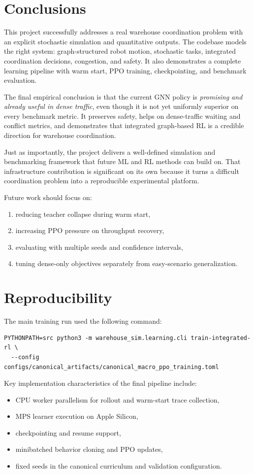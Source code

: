 \documentclass[11pt]{article}
\begin{document}
\section{Conclusions}
This project successfully addresses a real warehouse coordination problem with an explicit stochastic simulation and quantitative outputs. The codebase models the right system: graph-structured robot motion, stochastic tasks, integrated coordination decisions, congestion, and safety. It also demonstrates a complete learning pipeline with warm start, PPO training, checkpointing, and benchmark evaluation.

The final empirical conclusion is that the current GNN policy is \emph{promising and already useful in dense traffic}, even though it is not yet uniformly superior on every benchmark metric. It preserves safety, helps on dense-traffic waiting and conflict metrics, and demonstrates that integrated graph-based RL is a credible direction for warehouse coordination.

Just as importantly, the project delivers a well-defined simulation and benchmarking framework that future ML and RL methods can build on. That infrastructure contribution is significant on its own because it turns a difficult coordination problem into a reproducible experimental platform.

Future work should focus on:
\begin{enumerate}[leftmargin=1.5em]
    \item reducing teacher collapse during warm start,
    \item increasing PPO pressure on throughput recovery,
    \item evaluating with multiple seeds and confidence intervals,
    \item tuning dense-only objectives separately from easy-scenario generalization.
\end{enumerate}

\section{Reproducibility}
The main training run used the following command:
\begin{verbatim}
PYTHONPATH=src python3 -m warehouse_sim.learning.cli train-integrated-rl \
  --config configs/canonical_artifacts/canonical_macro_ppo_training.toml
\end{verbatim}

Key implementation characteristics of the final pipeline include:
\begin{itemize}[leftmargin=1.5em]
    \item CPU worker parallelism for rollout and warm-start trace collection,
    \item MPS learner execution on Apple Silicon,
    \item checkpointing and resume support,
    \item minibatched behavior cloning and PPO updates,
    \item fixed seeds in the canonical curriculum and validation configuration.
\end{itemize}
\end{document}

